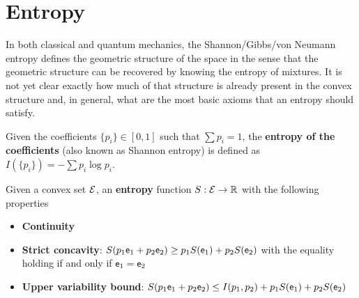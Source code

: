 \section{Entropy}

In both classical and quantum mechanics, the Shannon/Gibbs/von Neumann entropy defines the geometric structure of the space in the sense that the geometric structure can be recovered by knowing the entropy of mixtures. It is not yet clear exactly how much of that structure is already present in the convex structure and, in general, what are the most basic axioms that an entropy should satisfy.

\begin{defn}
	Given the coefficients $\{p_i\} \in [0,1]$ such that $\sum p_i = 1$, the \textbf{entropy of the coefficients} (also known as Shannon entropy) is defined as $I(\{p_i\}) = - \sum p_i \log p_i $.
\end{defn}

\begin{defn}
	Given a convex set $\mathcal{E}$, an \textbf{entropy} function $S : \mathcal{E} \to \mathbb{R}$ with the following properties
	\begin{itemize}
		\item \textbf{Continuity}
		\item \textbf{Strict concavity}: $S(p_1\mathsf{e}_1 + p_2 \mathsf{e}_2) \geq p_1 S(\mathsf{e}_1) + p_2 S(\mathsf{e}_2)$ with the equality holding if and only if $\mathsf{e}_1 = \mathsf{e}_2$
		\item \textbf{Upper variability bound}: $S(p_1\mathsf{e}_1 + p_2 \mathsf{e}_2) \leq I(p_1, p_2) + p_1 S(\mathsf{e}_1) + p_2 S(\mathsf{e}_2)$ 
	\end{itemize}
\end{defn}

